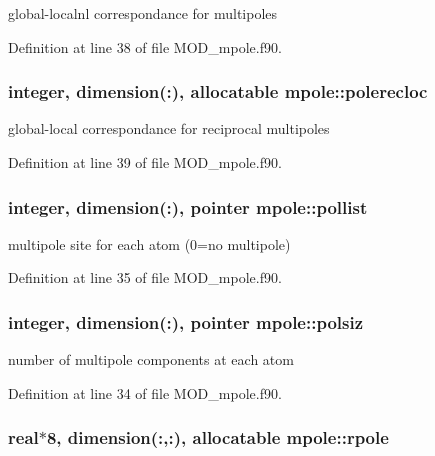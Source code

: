 global-\/localnl correspondance for multipoles 



Definition at line 38 of file M\-O\-D\-\_\-mpole.\-f90.

\hypertarget{classmpole_a782e3c5c7f9957625e165e5cf1fe70c0}{
\subsubsection[{polerecloc}]{\setlength{\rightskip}{0pt plus 5cm}integer, dimension(\-:), allocatable mpole\-::polerecloc}}\label{classmpole_a782e3c5c7f9957625e165e5cf1fe70c0}


global-\/local correspondance for reciprocal multipoles 



Definition at line 39 of file M\-O\-D\-\_\-mpole.\-f90.

\hypertarget{classmpole_a51c9cde82264984e146d7e12f305f94d}{
\subsubsection[{pollist}]{\setlength{\rightskip}{0pt plus 5cm}integer, dimension(\-:), pointer mpole\-::pollist}}\label{classmpole_a51c9cde82264984e146d7e12f305f94d}


multipole site for each atom (0=no multipole) 



Definition at line 35 of file M\-O\-D\-\_\-mpole.\-f90.

\hypertarget{classmpole_ad313a6af232574f7c741e2c9f75037de}{
\subsubsection[{polsiz}]{\setlength{\rightskip}{0pt plus 5cm}integer, dimension(\-:), pointer mpole\-::polsiz}}\label{classmpole_ad313a6af232574f7c741e2c9f75037de}


number of multipole components at each atom 



Definition at line 34 of file M\-O\-D\-\_\-mpole.\-f90.

\hypertarget{classmpole_ac883646ae13de31cf116db8163b674f6}{
\subsubsection[{rpole}]{\setlength{\rightskip}{0pt plus 5cm}real$\ast$8, dimension(\-:,\-:), allocatable mpole\-::rpole}}\label{classmpole_ac883646ae13de31cf116db8163b674f6}


